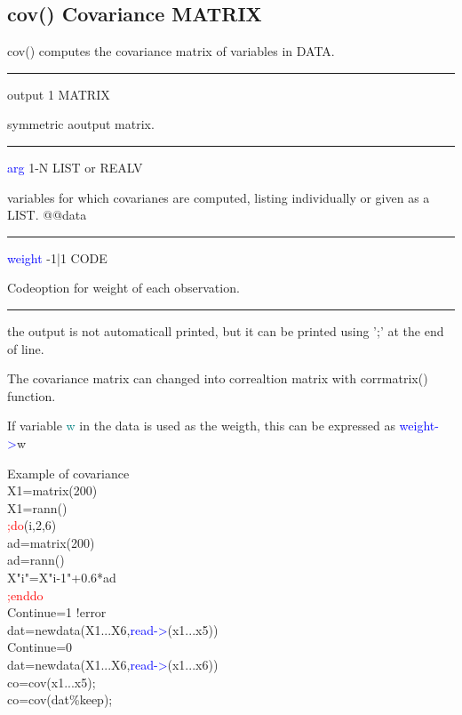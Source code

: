 \subsection{\textcolor{VioletRed}{cov}()  Covariance MATRIX}
\label{cov}
\textcolor{VioletRed}{cov}() computes the covariance matrix of variables in DATA.
\vspace{0.3cm}
\hrule
\vspace{0.3cm}
\noindent output \tabto{3cm} 1 \tabto{5cm}  MATRIX \tabto{7cm}
\begin{changemargin}{3cm}{0cm}
\noindent  symmetric aoutput matrix.
\end{changemargin}
\vspace{0.3cm}
\hrule
\vspace{0.3cm}
\noindent \textcolor{blue}{arg} \tabto{3cm}  1-N \tabto{5cm}  LIST or REALV \tabto{7cm}
\begin{changemargin}{3cm}{0cm}
\noindent  variables for which covarianes are computed, listing
individually or given as a LIST.
@@data
\end{changemargin}
\vspace{0.3cm}
\hrule
\vspace{0.3cm}
\noindent \textcolor{blue}{weight} \tabto{3cm} -1|1 \tabto{5cm}  CODE \tabto{7cm}
\begin{changemargin}{3cm}{0cm}
\noindent  Codeoption for weight of each observation.
\end {changemargin}
\hrule
\vspace{0.2cm}
\begin{note}
the output is not automaticall printed, but it can be printed using ';'
at the end of line.
\end{note}
\begin{note}
The covariance matrix can changed into correaltion matrix with \textcolor{VioletRed}{corrmatrix}()
function.
\end{note}
\begin{note}
If variable \textcolor{teal}{w} in the data is used as the weigth, this can be expressed as
\textcolor{blue}{weight->}w
\end{note}
\begin{example}[covex]Example of covariance\\
\label{covex}
X1=\textcolor{VioletRed}{matrix}(200)\\
X1=\textcolor{VioletRed}{rann}()\\
\textcolor{Red}{;do}(i,2,6)\\
ad=\textcolor{VioletRed}{matrix}(200)\\
ad=\textcolor{VioletRed}{rann}()\\
X"i"=X"i-1"+0.6*ad\\
\textcolor{Red}{;enddo}\\
Continue=1   !error\\
dat=\textcolor{VioletRed}{newdata}(X1...X6,\textcolor{blue}{read->}(x1...x5))\\
Continue=0\\
dat=\textcolor{VioletRed}{newdata}(X1...X6,\textcolor{blue}{read->}(x1...x6))\\
co=\textcolor{VioletRed}{cov}(x1...x5);\\
co=\textcolor{VioletRed}{cov}(dat\%keep);
\end{example}
